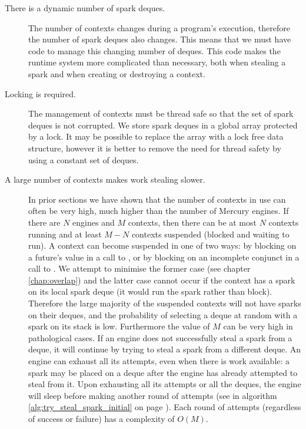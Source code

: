 \begin{description}

\item[There is a dynamic number of spark deques.]

The number of contexts changes during a program's execution,
therefore the number of spark deques also changes.
This means that we must have code to manage this changing number of
deques.
This code makes the runtime system more complicated than necessary,
both when stealing a spark and when creating or destroying a context.

\item[Locking is required.]

The management of contexts must be thread safe so that the set of
spark deques is not corrupted.
We store spark deques in a global array protected by a lock.
It may be possible to replace the array with a lock free data structure,
however it is better to remove the need for thread safety by using a
constant set of deques.

\item[A large number of contexts makes work stealing slower.]

In prior sections
we have shown that the number of contexts in use can often be very high,
much higher than the number of Mercury engines.
If there are $N$ engines and $M$ contexts,
then there can be at most $N$ contexts running and
at least $M-N$ contexts suspended (blocked and waiting to run).
A context can become suspended in one of two ways:
by blocking on a future's value in a call to \wait,
or by blocking on an incomplete conjunct in a call to \joinandcontinue.
We attempt to minimise the former case (see chapter \ref{chap:overlap})
and the latter case cannot occur
if the context has a spark on its local spark deque (it would run the
spark rather than block).
Therefore the large majority of the suspended contexts will not have
sparks on their deques,
and the probability of selecting a deque at random with a spark on its
stack is low.
Furthermore the value of $M$ can be very high in pathological cases.
If an engine does not successfully steal a spark from a deque,
it will continue by trying to steal a spark from a different deque.
An engine can exhaust all its attempts, even when there is work
available:
a spark may be placed on a deque after the engine has already attempted
to steal from it.
Upon exhausting all its attempts or all the deques,
the engine will sleep before making another round of attempts
(see \trystealspark in algorithm \ref{alg:try_steal_spark_initial} on
page \pageref{alg:try_steal_spark_initial}).
Each round of attempts (regardless of success or failure) has a
complexity of $O(M)$.

\end{description}

